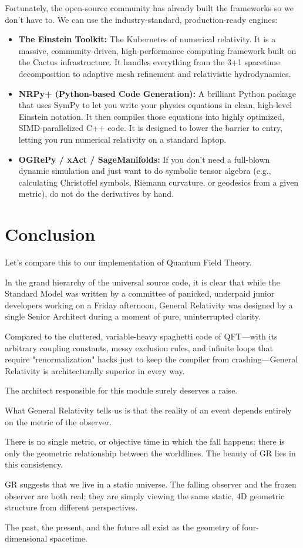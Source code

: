 Fortunately, the open-source community has already built the frameworks so we don't have to. We can use the industry-standard, production-ready engines:
\begin{itemize}
\item \textbf{The Einstein Toolkit:} The Kubernetes of numerical relativity.
  It is a massive, community-driven, high-performance computing framework built on the Cactus infrastructure.
  It handles everything from the 3+1 spacetime decomposition to adaptive mesh refinement and relativistic hydrodynamics.
\item \textbf{NRPy+ (Python-based Code Generation):} A brilliant Python package that uses SymPy to let you write your physics equations in clean, high-level Einstein notation.
  It then compiles those equations into highly optimized, SIMD-parallelized C++ code.
  It is designed to lower the barrier to entry, letting you run numerical relativity on a standard laptop.
\item \textbf{OGRePy / xAct / SageManifolds:} If you don't need a full-blown dynamic simulation and just want to do symbolic tensor algebra (e.g., calculating Christoffel symbols, Riemann curvature, or geodesics from a given metric), do not do the derivatives by hand.
\end{itemize}



\section{Conclusion}


Let's compare this to our implementation of Quantum Field Theory. 

In the grand hierarchy of the universal source code, it is clear that while the Standard Model was written by a committee of panicked, underpaid junior developers working on a Friday afternoon, General Relativity was designed by a single Senior Architect during a moment of pure, uninterrupted clarity.

Compared to the cluttered, variable-heavy spaghetti code of QFT—with its arbitrary coupling constants,
messy exclusion rules, and infinite loops that require "renormalization" hacks just to keep the compiler from crashing—General Relativity is architecturally superior in every way. 

The architect responsible for this module surely deserves a raise.

What General Relativity tells us is that the reality of an event depends entirely on the metric of the observer.

There is no single metric, or objective time in which the fall happens; there is only the geometric relationship between the worldlines.
The beauty of GR lies in this consistency.

GR suggests that we live in a static universe. The falling observer and the frozen observer are both real;
they are simply viewing the same static, 4D geometric structure from different perspectives.

The past, the present, and the future all exist as the geometry of four-dimensional spacetime.

